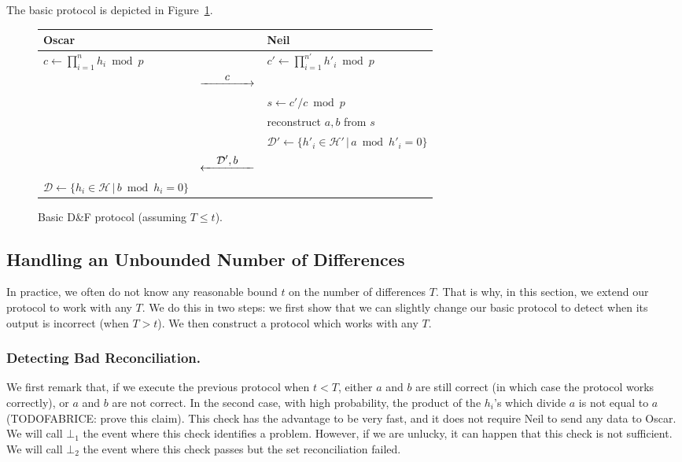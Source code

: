 \documentclass[11pt]{llncs}
\newcommand{\Set}{\mathcal{H}}
\newcommand{\SetD}{\mathcal{D}}
\newcommand{\df}{D\&F\xspace}
\newcommand{\Rflow}[1]{\stackrel{\displaystyle #1}{\hbox to 5em{\rightarrowfill}}}
\newcommand{\Lflow}[1]{\stackrel{\displaystyle #1}{\hbox to 5em{\leftarrowfill}}}
\begin{document}
The basic protocol is depicted in Figure~\ref{fig:basic-df}.

\begin{figure}
\centering
\begin{tabular}{lcl}
\toprule
\textbf{Oscar}                    &                        & \textbf{Neil}\\
\midrule
$c \gets \prod_{i=1}^n h_i \bmod p$        &                & $c' \gets \prod_{i=1}^{n'} h'_i \bmod p$ \\
                                  & $\Rflow{c}$            & \\
                                  &                        & $s \gets c'/c \bmod p$ \\
                                  &                        & reconstruct  $a,b$ from $s$\\
                                  &                        & $\SetD' \gets \{ h'_i \in \Set' \,|\, a \bmod h'_i = 0 \}$ \\
                                  & $\Lflow{\SetD',b}$     & \\
$\SetD \gets \{ h_i \in \Set \,|\, b \bmod h_i = 0 \}$ & & \\
\bottomrule
\end{tabular}\vspace{-0.25cm} %
\caption{Basic \df protocol (assuming $T \le t$).}
\label{fig:basic-df}
\end{figure}

\subsection{Handling an Unbounded Number of Differences}

In practice, we often do not know any reasonable bound $t$ on the number of differences $T$.
That is why, in this section, we extend our protocol to work with any $T$.
We do this in two steps: we first show that we can slightly change our basic protocol to detect when its output is incorrect (when $T > t$).
We then construct a protocol which works with any $T$.

\subsubsection{Detecting Bad Reconciliation.}
We first remark that, if we execute the previous protocol when $t < T$, either $a$ and $b$ are still correct (in which case the protocol works correctly), or $a$ and $b$ are not correct.
In the second case, with high probability, the product of the $h_i$'s which divide $a$ is not equal to $a$ (TODOFABRICE: prove this claim).
This check has the advantage to be very fast, and it does not require Neil to send any data to Oscar. We will call $\bot_1$ the event where this check identifies a problem. 
However, if we are unlucky, it can happen that this check is not sufficient. We will call $\bot_2$ the event where this check passes but the set reconciliation failed.
\end{document}
